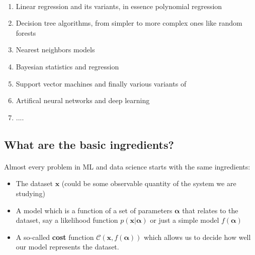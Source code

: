 \documentclass[%
oneside,                 %
final,                   %
10pt]{article}
\begin{document}
\paragraph{}
\begin{enumerate}
\item Linear regression and its variants, in essence polynomial regression

\item Decision tree algorithms, from simpler to more complex ones like random forests

\item Nearest neighbors models

\item Bayesian statistics and regression

\item Support vector machines and finally various variants of

\item Artifical neural networks and deep learning

\item ....
\end{enumerate}

\noindent



\subsection{What are the basic ingredients?}

\paragraph{}
Almost every problem in ML and data science starts with the same ingredients:
\begin{itemize}
\item The dataset $\mathbf{x}$ (could be some observable quantity of the system we are studying)

\item A model which is a function of a set of parameters $\mathbf{\alpha}$ that relates to the dataset, say a likelihood  function $p(\mathbf{x}\vert \mathbf{\alpha})$ or just a simple model $f(\mathbf{\alpha})$

\item A so-called \textbf{cost} function $\mathcal{C} (\mathbf{x}, f(\mathbf{\alpha}))$ which allows us to decide how well our model represents the dataset. 
\end{itemize}
\end{document}
